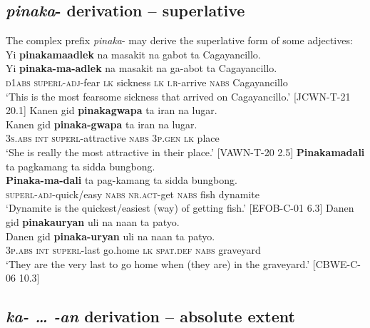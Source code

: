 \subsection{\textit{pinaka}- derivation – superlative}
\label{sec:pinaka-derivation}

The complex prefix \textit{pinaka}{}- may derive the superlative form of some adjectives:
\ea
Yi  \textbf{pinakamaadlek}  na  masakit  na  gabot  ta  Cagayancillo. \\\smallskip
 \gll Yi  \textbf{pinaka-ma-adlek}  na  masakit  na  ga-abot  ta  Cagayancillo. \\
\textsc{d}1\textsc{abs}  \textsc{superl}-\textsc{adj}-fear  \textsc{lk}  sickness  \textsc{lk}  \textsc{i.r}-arrive  \textsc{nabs}  Cagayancillo \\
\glt ‘This is  the most fearsome sickness that arrived on Cagayancillo.’ [JCWN-T-21 20.1]
\z
\ea
Kanen  gid  \textbf{pinakagwapa}  ta  iran  na  lugar. \\\smallskip
 \gll Kanen  gid  \textbf{pinaka-gwapa}  ta  iran  na  lugar. \\
3\textsc{s.abs}  \textsc{int}  \textsc{superl}-attractive  \textsc{nabs}  3\textsc{p.gen}  \textsc{lk}  place \\
\glt ‘She is really the most attractive in their place.’ [VAWN-T-20 2.5]
\z
\ea
\textbf{Pinakamadali}  ta  pagkamang  ta  sidda  bungbong. \\\smallskip
 \gll \textbf{Pinaka-ma-dali}  ta  pag-kamang  ta  sidda  bungbong. \\
\textsc{superl}-\textsc{adj}-quick/easy  \textsc{nabs}  \textsc{nr.act}-get  \textsc{nabs}  fish  dynamite \\
\glt ‘Dynamite is the quickest/easiest (way) of getting fish.’ [EFOB-C-01 6.3]
\z
\ea
Danen  gid  \textbf{pinakauryan}  uli  na  naan  ta  patyo. \\\smallskip
 \gll Danen  gid  \textbf{pinaka-uryan}  uli  na  naan  ta  patyo. \\
3\textsc{p.abs}  \textsc{int}  \textsc{superl}-last  go.home  \textsc{lk}  \textsc{spat.def}  \textsc{nabs}  graveyard \\
\glt ‘They are the very last to go home when (they are) in the graveyard.’ [CBWE-C-06 10.3]
\z

\subsection{\textit{ka- … -an} derivation – absolute extent}
\label{sec:ka-an-derivation}

